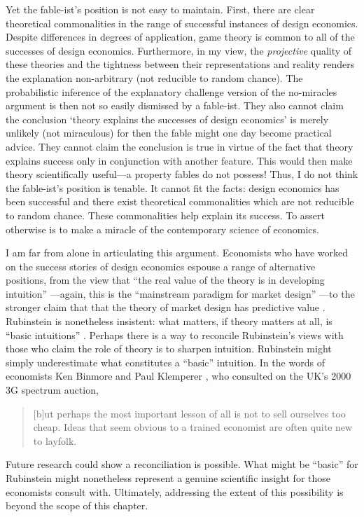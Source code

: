 Yet the fable-ist's position is not easy to maintain. First, there are clear theoretical commonalities in the range of successful instances of design economics. Despite differences in degrees of application, game theory is common to all of the successes of design economics. Furthermore, in my view, the \textit{projective} quality of these theories and the tightness between their representations and reality renders the explanation non-arbitrary (not reducible to random chance). The probabilistic inference of the explanatory challenge version of the no-miracles argument is then not so easily dismissed by a fable-ist. They also cannot claim the conclusion `theory explains the successes of design economics' is merely unlikely (not miraculous) for then the fable might one day become practical advice. They cannot claim the conclusion is true in virtue of the fact that theory explains success only in conjunction with another feature. This would then make theory scientifically useful---a property fables do not possess! Thus, I do not think the fable-ist's position is tenable. It cannot fit the facts: design economics has been successful and there exist theoretical commonalities which are not reducible to random chance. These commonalities help explain its success. To assert otherwise is to make a miracle of the contemporary science of economics.

I am far from alone in articulating this argument. Economists who have worked on the success stories of design economics espouse a range of alternative positions, from the view that ``the real value of the theory is in developing intuition'' \autocite[172]{mcafee1996}---again, this is the ``mainstream paradigm for market design'' \autocite[10]{sönmez2023minimalist}---to the stronger claim that that the theory of market design has predictive value \autocite{roth2002}. Rubinstein is nonetheless insistent: what matters, if theory matters at all, is ``basic intuitions'' \autocite[above]{rubinstein2012}. Perhaps there is a way to reconcile Rubinstein's views with those who claim the role of theory is to sharpen intuition. Rubinstein might simply underestimate what constitutes a ``basic'' intuition. In the words of economists Ken Binmore and Paul Klemperer \autocite*[C95]{binmore2002}, who consulted on the UK's 2000 3G spectrum auction, 
\begin{quote}
    [b]ut perhaps the most important lesson of all is not to sell ourselves too cheap. Ideas that seem obvious to a trained economist are often quite new to layfolk. 
\end{quote}
\noindent Future research could show a reconciliation is possible. What might be ``basic'' for Rubinstein might nonetheless represent a genuine scientific insight for those economists consult with. Ultimately, addressing the extent of this possibility is beyond the scope of this chapter.

